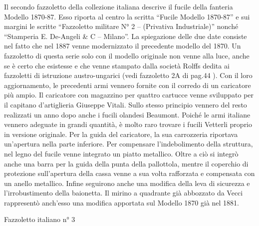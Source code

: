 Il secondo fazzoletto della collezione italiana descrive il fucile della
fanteria Modello 1870-87. Esso riporta al centro la scritta ``Fucile
Modello 1870-87'' e sui margini le scritte ``Fazzoletto militare N° 2 --
(Privativa Industriale)'' nonché ``Stamperia E. De-Angeli \& C --
Milano''. La spiegazione delle due date consiste nel fatto che nel 1887
venne modernizzato il precedente modello del 1870. Un fazzoletto di
questa serie solo con il modello originale non venne alla luce, anche se
è certo che esistesse e che venne stampato dalla società Rolffs dedita
ai fazzoletti di istruzione austro-ungarici (vedi fazzoletto 2A di
pag.44 ). Con il loro aggiornamento, le precedenti armi vennero fornite
con il corredo di un caricatore più ampio. Il caricatore con magazzino
per quattro cartucce venne sviluppato per il capitano d'artiglieria
Giuseppe Vitali. Sullo stesso principio vennero del resto realizzati un
anno dopo anche i fucili olandesi Beaumont. Poiché le armi italiane
vennero adeguate in grandi quantità, è molto raro trovare i fucili
Vetterli proprio in versione originale. Per la guida del caricatore, la
sua carrozzeria riportava un'apertura nella parte inferiore. Per
compensare l'indebolimento della struttura, nel legno del fucile venne
integrato un piatto metallico. Oltre a ciò si integrò anche una barra
per la guida della punta della pallottola, mentre il coperchio di
protezione sull'apertura della cassa venne a sua volta rafforzata e
compensata con un anello metallico. Infine seguirono anche una modifica
della leva di sicurezza e l'irrobustimento della baionetta. Il mirino a
quadrante già abbozzato da Vecci rappresentò anch'esso una modifica
apportata sul Modello 1870 già nel 1881.

Fazzoletto italiano n° 3

